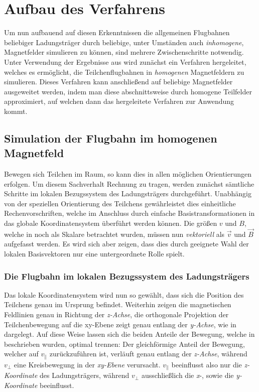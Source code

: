 \chapter{Aufbau des Verfahrens}

Um nun aufbauend auf diesen Erkenntnissen die allgemeinen Flugbahnen beliebiger Ladungstr\"ager durch beliebige, unter Umst\"anden
auch \textit{inhomogene}, Magnetfelder simulieren zu k\"onnen, sind mehrere Zwischenschritte notwendig.
Unter Verwendung der Ergebnisse aus  wird zun\"achst ein Verfahren hergeleitet, welches es erm\"oglicht,
die Teilchenflugbahnen in \textit{homogenen} Magnetfeldern zu simulieren. Dieses Verfahren kann anschlie{\ss}end auf beliebige
Magnetfelder ausgeweitet werden, indem man diese abschnittsweise durch homogene Teilfelder approximiert, auf welchen dann das
hergeleitete Verfahren zur Anwendung kommt.

\section{Simulation der Flugbahn im homogenen Magnetfeld}

Bewegen sich Teilchen im Raum, so kann dies in allen m\"oglichen Orientierungen erfolgen. Um diesem Sachverhalt Rechnung zu tragen,
werden zun\"achst s\"amtliche Schritte im lokalen Bezugssystem des Ladungstr\"agers durchgef\"uhrt. Unabh\"angig von der speziellen
Orientierung des Teilchens gew\"ahrleistet dies einheitliche Rechenvorschriften, welche im Anschluss durch einfache
Basistransformationen in das globale Koordinatensystem \"uberf\"uhrt werden k\"onnen. Die gr\"o{\ss}en \(v\) und \(B\), welche
in  noch als Skalare betrachtet wurden, m\"ussen nun \textit{vektoriell} als \(\vec{v}\) und \(\vec{B}\)
aufgefasst werden. Es wird sich aber zeigen, dass dies durch geeignete Wahl der lokalen Basisvektoren nur eine untergeordnete Rolle
spielt.

\subsection{Die Flugbahn im lokalen Bezugssystem des Ladungstr\"agers}
\label{sec:lokales_bezugssystem}

Das lokale Koordinatensystem wird nun so gew\"ahlt, dass sich die Position des Teilchens genau im Ursprung befindet.
Weiterhin zeigen die magnetischen
Feldlinien genau in Richtung der \textit{z-Achse}, die orthogonale Projektion der Teilchenbewegung auf die xy-Ebene zeigt genau
entlang der \textit{y-Achse}, wie in  dargelegt. Auf diese Weise lassen sich die beiden Anteile der
Bewegung, welche in 
beschrieben wurden, optimal trennen: Der gleichf\"ormige Anteil der Bewegung, welcher auf \(v_\parallel\) zur\"uckzuf\"uhren ist,
verl\"auft genau entlang der \textit{z-Achse}, w\"ahrend \(v_\perp\) eine Kreisbewegung in der \textit{xy-Ebene} verursacht.
\(v_\parallel\) beeinflusst also nur die \textit{z-Koordinate} des Ladungstr\"agers, w\"ahrend \(v_\perp\) ausschlie{\ss}lich die
\textit{x}-, sowie die \textit{y-Koordinate} beeinflusst.

